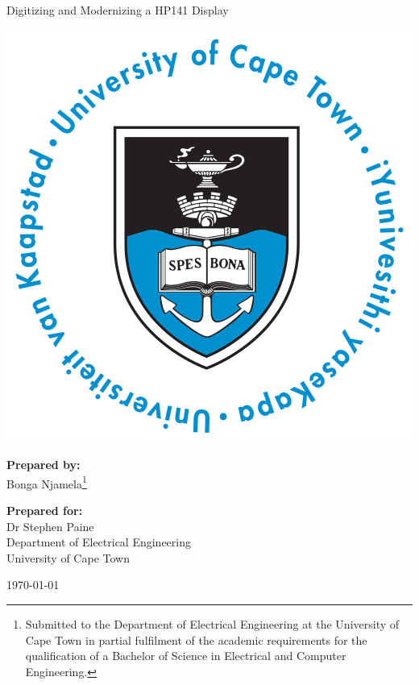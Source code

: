 \thispagestyle{empty}
\begin{center}
    
\Huge

\vspace{5cm}

Digitizing and Modernizing a HP141 Display

\vspace{2.5cm}

\includegraphics[width=0.4\linewidth]{FrontMatter/UCT_logo.png}

\vfill

\large
\textbf{Prepared by:}\\
Bonga Njamela\footnote{Submitted to the Department of Electrical Engineering at the University of Cape Town in partial fulfilment of the academic requirements for the qualification of a Bachelor of Science in Electrical and Computer Engineering.}

\vspace{1cm}

\textbf{Prepared for:}\\
Dr Stephen Paine\\
Department of Electrical Engineering\\
University of Cape Town

\vspace{2cm}

\today

\end{center}